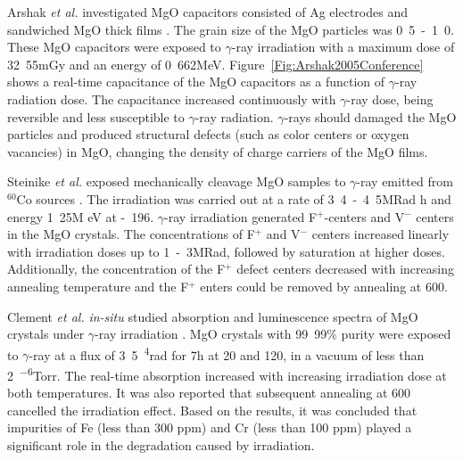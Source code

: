\documentclass[molecules,review,submit,pdftex,moreauthors]{Definitions/mdpi}
\begin{document}
Arshak \textit{et al.} investigated MgO capacitors consisted of Ag electrodes and sandwiched MgO thick films \cite{Arshak2005Conference,Arshak2006IEEE}.  The grain size of the MgO particles was \unit{0.5 - 1.0}{\micro\meter}.  These MgO capacitors were exposed to $\gamma$-ray irradiation with a maximum dose of \unit{32.55}{mGy} and an energy of  \unit{0.662}{MeV}.  Figure~\ref{Fig:Arshak2005Conference} shows a real-time capacitance of the MgO capacitors as a function of $\gamma$-ray radiation dose.  The capacitance increased continuously with $\gamma$-ray dose, being reversible and less susceptible to $\gamma$-ray radiation.  $\gamma$-rays should damaged the MgO particles and produced structural defects (such as color centers or oxygen vacancies) in MgO, changing the density of charge carriers of the MgO films.  

 
Steinike \textit{et al.} exposed mechanically cleavage MgO samples to $\gamma$-ray emitted from $^{60}$Co sources \cite{Steinike1981KT}.  The irradiation was carried out at a rate of \unit{3.4 - 4.5}{MRad \per h} and energy \unit{1.25}{M eV} at \unit{- 196}{\celsius}.  $\gamma$-ray irradiation generated F$^+$-centers and V$^-$ centers in the MgO crystals.  The concentrations of F$^+$ and V$^-$ centers increased linearly with irradiation doses up to \unit{1 - 3}{MRad}, followed by saturation at higher doses.  Additionally, the concentration of the F$^+$ defect centers decreased with increasing annealing temperature and the F$^+$ enters could be removed by annealing at \unit{600}{\celsius}.


Clement \textit{et al.} \textit{in-situ} studied absorption and luminescence spectra of MgO crystals under $\gamma$-ray irradiation \cite{Clement1984PRB}.  MgO crystals with \unit{99.99}{\%} purity were exposed to $\gamma$-ray at a flux of \unit{3.5 ^4}{rad \per \hour} for \unit{7}{h} at \unit{20}{\celsius} and \unit{120}{\celsius}, in a vacuum of less than \unit{2 ^{-6}}{Torr}.  The real-time absorption increased with increasing irradiation dose at both temperatures.  It was also reported that subsequent annealing at \unit{600}{\celsius} cancelled the irradiation effect.  Based on the results, it was concluded that impurities of Fe (less than 300 ppm) and Cr (less than 100 ppm) played a significant role in the degradation caused by irradiation.
\end{document}
